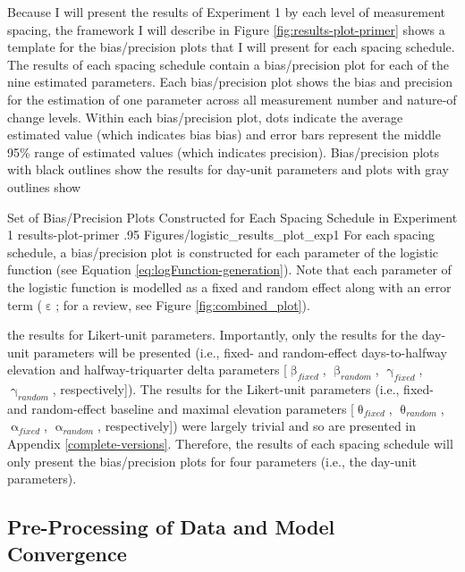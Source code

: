\documentclass[
12pt, %
twoside,
english]{guelphthesis}
\begin{document}
Because I will present the results of Experiment 1 by each level of measurement spacing, the framework I will describe in Figure \ref{fig:results-plot-primer} shows a template for the bias/precision plots that I will present for each spacing schedule. The results of each spacing schedule contain a bias/precision plot for each of the nine estimated parameters. Each bias/precision plot shows the bias and precision for the estimation of one parameter across all measurement number and nature-of change levels. Within each bias/precision plot, dots indicate the average estimated value (which indicates bias bias) and error bars represent the middle 95\% range of estimated values (which indicates precision). Bias/precision plots with black outlines show the results for day-unit parameters and plots with gray outlines show
\begin{apaFigure}
[portrait]
[samepage]
[-0.2cm]
{Set of Bias/Precision Plots Constructed for Each Spacing Schedule in Experiment 1}
{results-plot-primer}
{.95}
{Figures/logistic_results_plot_exp1}
{For each spacing schedule, a bias/precision plot is constructed for each parameter of the logistic function (see Equation \ref{eq:logFunction-generation}). Note that each parameter of the logistic function is modelled as a fixed and random effect along with an error term ($\upepsilon$; for a review, see Figure \ref{fig:combined_plot}).}
\end{apaFigure}
\noindent the results for Likert-unit parameters. Importantly, only the results for the day-unit parameters will be presented (i.e., fixed- and random-effect days-to-halfway elevation and halfway-triquarter delta parameters {[}\(\upbeta_{fixed}\), \(\upbeta_{random}\), \(\upgamma_{fixed}\), \(\upgamma_{random}\), respectively{]}). The results for the Likert-unit parameters (i.e., fixed- and random-effect baseline and maximal elevation parameters {[}\(\uptheta_{fixed}\), \(\uptheta_{random}\), \(\upalpha_{fixed}\), \(\upalpha_{random}\), respectively{]}) were largely trivial and so are presented in Appendix \ref{complete-versions}. Therefore, the results of each spacing schedule will only present the bias/precision plots for four parameters (i.e., the day-unit parameters).

\hypertarget{pre-processing-of-data-and-model-convergence}{%
\subsection{Pre-Processing of Data and Model Convergence}\label{pre-processing-of-data-and-model-convergence}}
\end{document}
